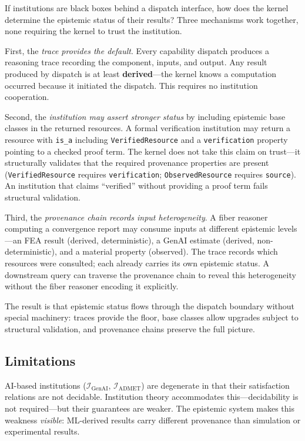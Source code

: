 \documentclass[10pt,twocolumn,letterpaper]{article}
\newcommand{\code}[1]{\texttt{\small #1}}
\begin{document}
If institutions are black boxes behind a dispatch interface, how does the kernel determine the epistemic status of their results?
Three mechanisms work together, none requiring the kernel to trust the institution.

First, the \emph{trace provides the default}.
Every capability dispatch produces a reasoning trace recording the component, inputs, and output.
Any result produced by dispatch is at least \textbf{derived}---the kernel knows a computation occurred because it initiated the dispatch.
This requires no institution cooperation.

Second, the \emph{institution may assert stronger status} by including epistemic base classes in the returned resources.
A formal verification institution may return a resource with \code{is\_a} including \code{VerifiedResource} and a \code{verification} property pointing to a checked proof term.
The kernel does not take this claim on trust---it structurally validates that the required provenance properties are present (\code{VerifiedResource} requires \code{verification}; \code{ObservedResource} requires \code{source}).
An institution that claims ``verified'' without providing a proof term fails structural validation.

Third, the \emph{provenance chain records input heterogeneity}.
A fiber reasoner computing a convergence report may consume inputs at different epistemic levels---an FEA result (derived, deterministic), a GenAI estimate (derived, non-deterministic), and a material property (observed).
The trace records which resources were consulted; each already carries its own epistemic status.
A downstream query can traverse the provenance chain to reveal this heterogeneity without the fiber reasoner encoding it explicitly.

The result is that epistemic status flows through the dispatch boundary without special machinery: traces provide the floor, base classes allow upgrades subject to structural validation, and provenance chains preserve the full picture.

\subsection{Limitations}

AI-based institutions ($\mathcal{I}_{\text{GenAI}}$, $\mathcal{I}_{\text{ADMET}}$) are degenerate in that their satisfaction relations are not decidable.
Institution theory accommodates this---decidability is not required---but their guarantees are weaker.
The epistemic system makes this weakness \emph{visible}: ML-derived results carry different provenance than simulation or experimental results.
\end{document}
